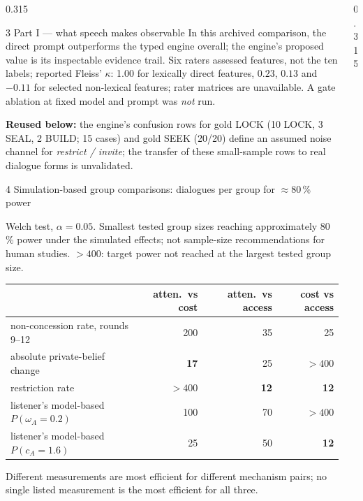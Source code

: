 \documentclass[final,t]{beamer}
\begin{document}
\begin{frame}[t]
\begin{columns}[t,totalwidth=0.965\paperwidth]
\begin{column}{0.315\textwidth}
\begin{block}{3 \; Part I --- what speech makes observable}
\medskip
In this archived comparison, the direct prompt outperforms the typed engine overall; the engine's proposed value is its inspectable evidence trail. Six raters assessed features, not the ten labels; reported Fleiss' $\kappa$: 1.00 for lexically direct features, $0.23$, $0.13$ and $-0.11$ for selected non-lexical features; rater matrices are unavailable. A gate ablation at fixed model and prompt was \emph{not} run.

\medskip
\textbf{Reused below:} the engine's confusion rows for gold LOCK (10 LOCK, 3 SEAL, 2 BUILD; 15 cases) and gold SEEK (20/20) define an assumed noise channel for \emph{restrict / invite}; the transfer of these small-sample rows to real dialogue forms is unvalidated.
\end{block}

\begin{block}{4 \; Simulation-based group comparisons: dialogues per group for $\approx$80\,\% power}
{\small Welch test, $\alpha=0.05$. Smallest tested group sizes reaching approximately 80\,\% power under the simulated effects; not sample-size recommendations for human studies. $>400$: target power not reached at the largest tested group size.\\[0.15cm]\begin{tabular}{@{}lrrr@{}}
\toprule
 & atten.\ vs cost & atten.\ vs access & cost vs access\\
\midrule
non-concession rate, rounds 9--12 & 200 & 35 & 25\\
absolute private-belief change & \textbf{17} & 25 & $>400$\\
restriction rate & $>400$ & \textbf{12} & \textbf{12}\\
listener's model-based $P(\omega_A{=}0.2)$ & 100 & 70 & $>400$\\
listener's model-based $P(c_A{=}1.6)$ & 25 & 50 & \textbf{12}\\
\bottomrule
\end{tabular}
\smallskip

Different measurements are most efficient for different mechanism pairs; no single listed measurement is the most efficient for all three.
}
\end{block}

\end{column}

\begin{column}{0.315\textwidth}


\end{column}
\end{columns}
\end{frame}
\end{document}
